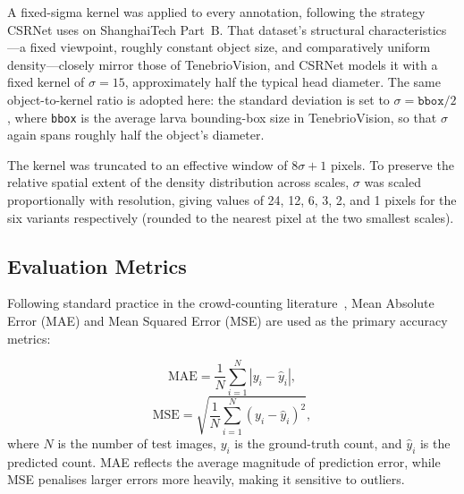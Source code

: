 \documentclass[conference]{IEEEtran}
\begin{document}
A fixed-sigma kernel was applied to every annotation, following the strategy
CSRNet uses on ShanghaiTech Part~B. That dataset's structural
characteristics---a fixed viewpoint, roughly constant object size, and
comparatively uniform density---closely mirror those of TenebrioVision, and
CSRNet models it with a fixed kernel of $\sigma = 15$, approximately half the
typical head diameter. The same object-to-kernel ratio is adopted here: the standard
deviation is set to $\sigma = \texttt{bbox}/2$, where \texttt{bbox} is the
average larva bounding-box size in TenebrioVision, so that $\sigma$ again spans
roughly half the object's diameter.

The kernel was truncated to an effective window of $8\sigma + 1$ pixels. To
preserve the relative spatial extent of the density distribution across scales,
$\sigma$ was scaled proportionally with resolution, giving values of 24, 12, 6,
3, 2, and 1 pixels for the six variants respectively (rounded to the nearest
pixel at the two smallest scales).

\subsection{Evaluation Metrics}\label{sec:eval_metrics}
Following standard practice in the crowd-counting literature~\cite{gao2020crowdcountingsurvey}, Mean Absolute Error (MAE) and Mean Squared Error (MSE) are used as the primary accuracy metrics:

\begin{equation}
    \text{MAE} = \frac{1}{N} \sum_{i=1}^{N} \left| y_i - \hat{y}_i \right|,
\end{equation}
\begin{equation}
    \text{MSE} = \sqrt{\frac{1}{N} \sum_{i=1}^{N}
    \left( y_i - \hat{y}_i \right)^2},
\end{equation}
where $N$ is the number of test images, $y_i$ is the ground-truth count, and
$\hat{y}_i$ is the predicted count. MAE reflects the average magnitude of
prediction error, while MSE penalises larger errors more heavily, making it
sensitive to outliers.
\end{document}
